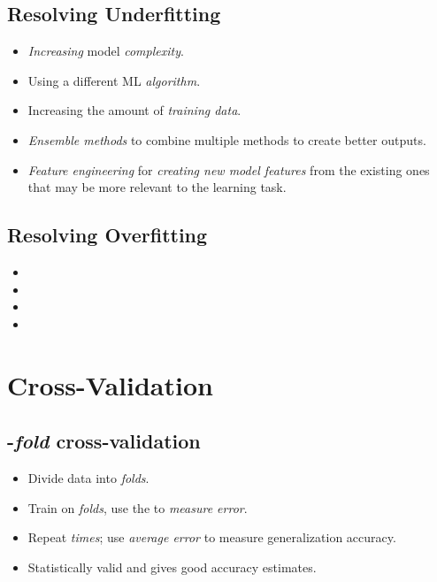 \documentclass[
	number={1},
	title={Machine Learning Fundamentals}
]{cs584notes}
\begin{document}
\subsection{Resolving Underfitting}\label{subsec:resolving-underfitting}
\begin{itemize}
	\item \emph{Increasing} model \emph{complexity}.
	\item Using a different ML \emph{algorithm}.
	\item Increasing the amount of \emph{training data}.
	\item \emph{Ensemble methods} to combine multiple methods to create better outputs.
	\item \emph{Feature engineering} for \emph{creating new model features} from the existing ones that may be more relevant to the learning task.
\end{itemize}

\subsection{Resolving Overfitting}\label{subsec:resolving-overfitting}
\begin{itemize}
	\item {}
	\item {}
	\item {}
	\item {}
\end{itemize}

\section{Cross-Validation}\label{sec:cross-validation}
\subsection{-\emph{fold} cross-validation}\label{subsec:k-fold-cross-validation}
\begin{itemize}
	\item Divide data into  \emph{folds}.
	\item Train on  \emph{folds}, use the  to \emph{measure error}.
	\item Repeat  \emph{times}; use \emph{average error} to measure generalization accuracy.
	\item Statistically valid and gives good accuracy estimates.
\end{itemize}
\end{document}
